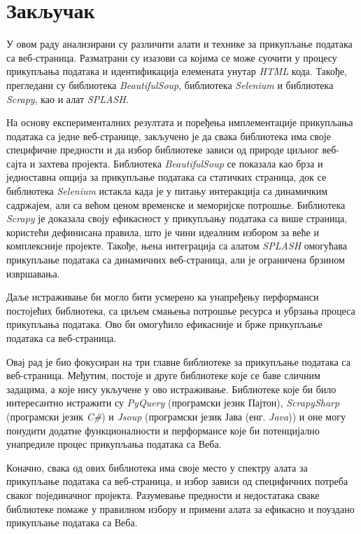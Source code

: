 \documentclass[12pt,oneside]{memoir}
\begin{document}
\chapter{Закључак}
\label{chp:zakljucak}
У овом раду анализирани су различити алати и технике за прикупљање података са веб-страница. Разматрани су изазови са којима се може суочити у процесу прикупљања података и идентификација елемената унутар \textit{HTML} кода. Такође, прегледани су библиотека \textit{BeautifulSoup}, библиотека \textit{Selenium} и библиотека \textit{Scrapy}, као и алат \textit{SPLASH}.

На основу експерименталних резултата и поређења имплементације прикупљања података са једне веб-странице, закључено је да свака библиотека има своје специфичне предности и да избор библиотеке зависи од природе циљног веб-сајта и захтева пројекта. Библиотека \textit{BeautifulSoup} се показала као брза и једноставна опција за прикупљање података са статичких страница, док се библиотека \textit{Selenium} истакла када је у питању интеракција са динамичким садржајем, али са већом ценом временске и меморијске потрошње. Библиотека \textit{Scrapy} је доказала своју ефикасност у прикупљању података са више страница, користећи дефинисана правила, што је чини идеалним избором за веће и комплексније пројекте. Такође, њена интеграција са алатом \textit{SPLASH} омогућава прикупљање података са динамичних веб-страница, али је ограничена брзином извршавања.

Даље истраживање би могло бити усмерено ка унапређењу перформанси постојећих библиотека, са циљем смањења потрошње ресурса и убрзања процеса прикупљања података. Ово би омогућило ефикасније и брже прикупљање података са веб-страница.

Овај рад је био фокусиран на три главне библиотеке за прикупљање података са веб-страница. Међутим, постоје и друге библиотеке које се баве сличним задацима, а које нису укључене у ово истраживање. Библиотеке које би било интересантно истражити су \textit{PyQuery} (програмски језик Пајтон), \textit{ScrapySharp} (програмски језик \textit{C\#}) и \textit{Jsoup} (програмски језик Јава (енг. \textit{Java})) и оне могу понудити додатне функционалности и перформансе које би потенцијално унапредиле процес прикупљања података са Веба.

Коначно, свака од ових библиотека има своје место у спектру алата за прикупљање података са веб-страница, и избор зависи од специфичних потреба сваког појединачног пројекта. Разумевање предности и недостатака сваке библиотеке помаже у правилном избору и примени алата за ефикасно и поуздано прикупљање података са Веба.
\end{document}
